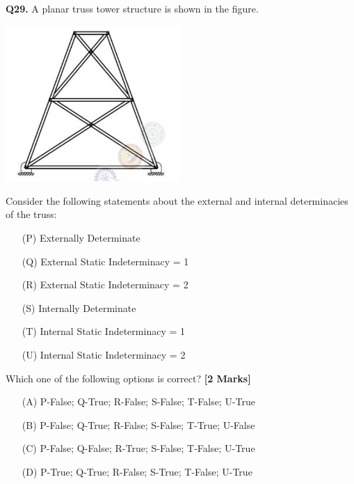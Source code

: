\documentclass[11pt]{article}
\newcommand{\questionb}[2]{
    \noindent\textbf{Q#2.} #1 \hfill \textbf{[2 Marks]}
}
\begin{document}
\questionb{A planar truss tower structure is shown in the figure. 
\begin{center}
\includegraphics[width=0.5\textwidth]{figures/29.png}
\end{center}
Consider the following statements about the external and internal determinacies of the truss:
\begin{itemize}
    \item[(P)] Externally Determinate
    \item[(Q)] External Static Indeterminacy = 1
    \item[(R)] External Static Indeterminacy = 2
    \item[(S)] Internally Determinate
    \item[(T)] Internal Static Indeterminacy = 1
    \item[(U)] Internal Static Indeterminacy = 2
\end{itemize}
Which one of the following options is correct?}{29}
\begin{enumerate}
    \item[(A)] P-False; Q-True; R-False; S-False; T-False; U-True
    \item[(B)] P-False; Q-True; R-False; S-False; T-True; U-False
    \item[(C)] P-False; Q-False; R-True; S-False; T-False; U-True
    \item[(D)] P-True; Q-True; R-False; S-True; T-False; U-True
\end{enumerate}

\vspace{0.5cm}
\end{document}
